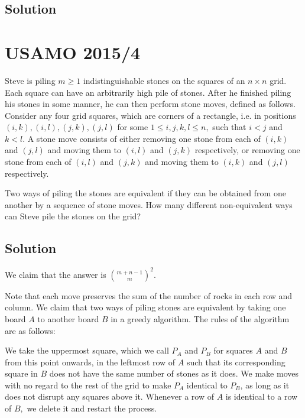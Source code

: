 \documentclass{article}
\begin{document}
\subsection{Solution}

\pagebreak\section{USAMO 2015/4}

Steve is piling $m \geq 1$ indistinguishable stones on the squares of an $n \times n$ grid. Each square can have an arbitrarily high pile of stones. After he finished piling his stones in some manner, he can then perform stone moves, defined as follows. Consider any four grid squares, which are corners of a rectangle, i.e. in positions $(i, k),(i, l),(j, k),(j, l)$ for some $1 \leq i, j, k, l \leq n,$ such that $i<j$ and $k<l .$ A stone move consists of either removing one stone from each of $(i, k)$ and $(j, l)$ and moving them to $(i, l)$ and $(j, k)$ respectively, or removing one stone from each of $(i, l)$ and $(j, k)$ and moving them to $(i, k)$ and $(j, l)$ respectively.

Two ways of piling the stones are equivalent if they can be obtained from one another by a sequence of stone moves. How many different non-equivalent ways can Steve pile the stones on the grid?

\subsection{Solution}

We claim that the answer is $\binom{m+n-1}{m}^2.$

Note that each move preserves the sum of the number of rocks in each row and column. We claim that two ways of piling stones are equivalent by taking one board $A$ to another board $B$ in a greedy algorithm. The rules of the algorithm are as follows:

\begin{itemize}
\Item We take the uppermost square, which we call $P_A$ and $P_B$ for squares $A$ and $B$ from this point onwards, in the leftmost row of $A$ such that its corresponding square in $B$ does not have the same number of stones as it does.
\Item We make moves with no regard to the rest of the grid to make $P_A$ identical to $P_B$, as long as it does not disrupt any squares above it.
\Item Whenever a row of $A$ is identical to a row of $B,$ we delete it and restart the process.
\end{itemize}
\end{document}
